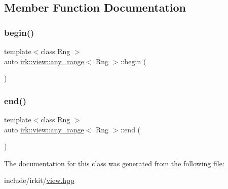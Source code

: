 \subsection{Member Function Documentation}
\mbox{\label{classirk_1_1view_1_1any__range_ab75107cb78021f372510402b71a0c4d5}} 
\subsubsection{\texorpdfstring{begin()}{begin()}}
{\footnotesize\ttfamily template$<$class Rng $>$ \\
auto \mbox{\hyperlink{classirk_1_1view_1_1any__range}{irk\+::view\+::any\+\_\+range}}$<$ Rng $>$\+::begin (\begin{DoxyParamCaption}{ }\end{DoxyParamCaption})\hspace{0.3cm}{\ttfamily [inline]}}

\mbox{\label{classirk_1_1view_1_1any__range_ac176e096d851d509b2fb3f22a28cd401}} 
\subsubsection{\texorpdfstring{end()}{end()}}
{\footnotesize\ttfamily template$<$class Rng $>$ \\
auto \mbox{\hyperlink{classirk_1_1view_1_1any__range}{irk\+::view\+::any\+\_\+range}}$<$ Rng $>$\+::end (\begin{DoxyParamCaption}{ }\end{DoxyParamCaption})\hspace{0.3cm}{\ttfamily [inline]}}



The documentation for this class was generated from the following file\+:\begin{DoxyCompactItemize}
\item 
include/irkit/\mbox{\hyperlink{view_8hpp}{view.\+hpp}}\end{DoxyCompactItemize}
